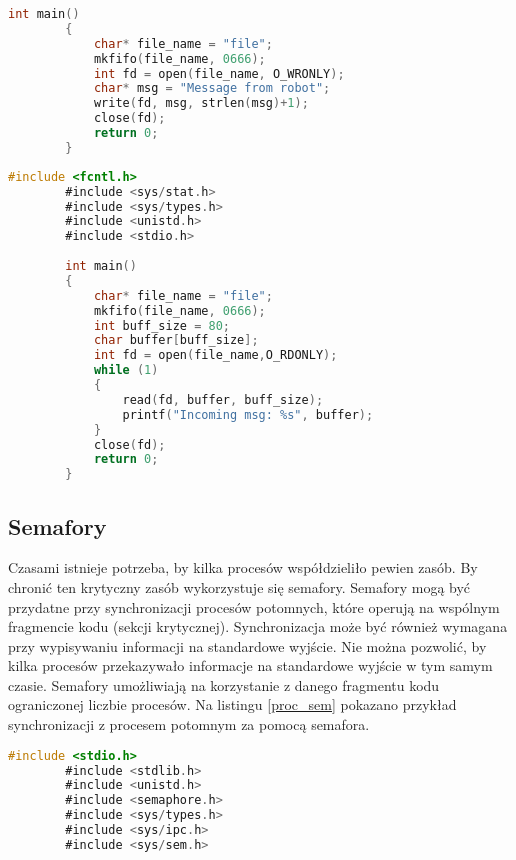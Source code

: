 {{\begin{lstlisting}[caption=Przykładowa implementacja procesu zapisującego dane do potoku nazwanego w języku~C, language=C, label=pipe_write]
        int main()
        {
            char* file_name = "file";
            mkfifo(file_name, 0666);
            int fd = open(file_name, O_WRONLY);
            char* msg = "Message from robot";
            write(fd, msg, strlen(msg)+1);
            close(fd);
            return 0;
        }
        \end{lstlisting}

        \begin{lstlisting}[caption=Przykładowa implementacja procesu odczytującego dane z potoku nazwanego w języku~C, language=C, label=pipe_read]
        #include <fcntl.h>
        #include <sys/stat.h>
        #include <sys/types.h>
        #include <unistd.h>
        #include <stdio.h>
        
        int main()
        {
            char* file_name = "file";
            mkfifo(file_name, 0666);
            int buff_size = 80;
            char buffer[buff_size];
            int fd = open(file_name,O_RDONLY);
            while (1)
            {
                read(fd, buffer, buff_size);
                printf("Incoming msg: %s", buffer);
            }
            close(fd);
            return 0;
        }
        \end{lstlisting}
    }
    \subsection{Semafory}
    {
        Czasami istnieje potrzeba, by kilka procesów współdzieliło pewien zasób. By chronić ten krytyczny zasób wykorzystuje się semafory. Semafory mogą być przydatne przy synchronizacji procesów potomnych, które operują na wspólnym fragmencie kodu (sekcji krytycznej). Synchronizacja może być również wymagana przy wypisywaniu informacji na standardowe wyjście. Nie można pozwolić, by kilka procesów przekazywało informacje na standardowe wyjście w tym samym czasie. Semafory umożliwiają na korzystanie z danego fragmentu kodu ograniczonej liczbie procesów. Na listingu \ref{proc_sem} pokazano przykład synchronizacji z procesem potomnym za pomocą semafora.

        \newpage
        \begin{lstlisting}[caption=Przykładowa implementacja synchronizacji z procesem potomnym w języku~C, language=C, label=proc_sem]
        #include <stdio.h>
        #include <stdlib.h>
        #include <unistd.h>
        #include <semaphore.h>
        #include <sys/types.h>
        #include <sys/ipc.h>
        #include <sys/sem.h>
        

\end{lstlisting}}}
